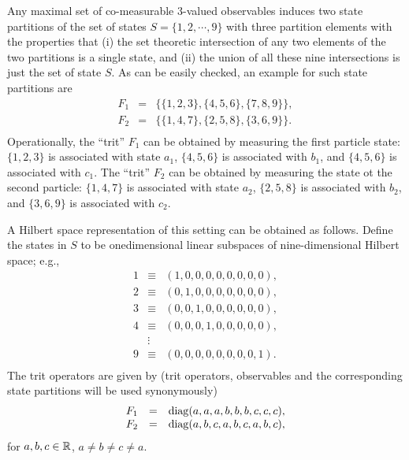 Any maximal set of
co-measurable $3$-valued observables induces two state partitions
of the set of states $S=\{1,2,\cdots , 9\}$ with three partition
elements with the properties
that (i) the set theoretic intersection of any two elements of the two
partitions is a single state, and (ii) the union of all these nine
intersections is just the set of state $S$.
As can be easily checked, an example for such state partitions are
\begin{equation}
\begin{array}{llll}
F_1&=&\{\{1,2,3\},\{4,5,6\},\{7,8,9\}\},\\
F_2&=&\{\{1,4,7\},\{2,5,8\},\{3,6,9\}\}.\\
\end{array}
\label{2001-general-ps3e}
\end{equation}
Operationally, the ``trit'' $F_1$ can be obtained by
measuring the first particle state:
$\{1,2,3\}$ is associated with state $a_1$,
$\{4,5,6\}$ is associated with $b_1$,  and
$\{4,5,6\}$ is associated with $c_1$.
The ``trit'' $F_2$ can be obtained by
measuring the state ot the second particle:
$\{1,4,7\}$ is associated with state $a_2$,
$\{2,5,8\}$ is associated with $b_2$,  and
$\{3,6,9\}$ is associated with $c_2$.

A Hilbert space representation of this setting can be obtained as
follows.
Define the states in $S$ to be onedimensional linear subspaces of
nine-dimensional Hilbert space; e.g.,
\begin{equation}
\begin{array}{llll}
1 &\equiv& (1,0,0,0,0,0,0,0,0),\\
2 &\equiv& (0,1,0,0,0,0,0,0,0),\\
3 &\equiv& (0,0,1,0,0,0,0,0,0),\\
4 &\equiv& (0,0,0,1,0,0,0,0,0),\\
  &\vdots&\\
9 &\equiv& (0,0,0,0,0,0,0,0,1).\\
\end{array}
\label{2001-general-ps3a}
\end{equation}
The trit operators are given by (trit operators, observables and the
corresponding state partitions will be used synonymously)
\begin{equation}
\begin{array}{llll}
F_1&=& {\rm diag} (a,a,a,b,b,b,c,c,c),\\
F_2&=& {\rm diag} (a,b,c,a,b,c,a,b,c),\\
\end{array}
\label{2001-general-ps3top}
\end{equation}
for $a,b,c \in {\Bbb R}$, $a\neq b\neq c\neq a$.

